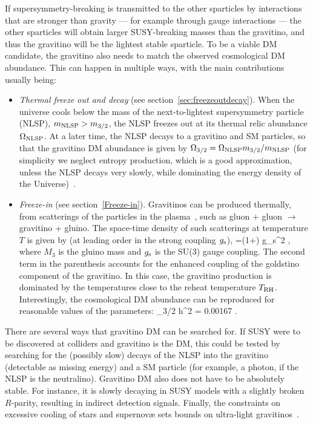 If supersymmetry-breaking is transmitted to the other sparticles by interactions that are stronger than gravity --- for example through gauge interactions ---
the other sparticles will obtain larger SUSY-breaking masses than the gravitino, and thus 
the gravitino will be the lightest stable sparticle.
To be a viable DM candidate, the gravitino also needs to match the observed cosmological DM abundance. 
This can happen in multiple ways, with the main contributions usually being:
\begin{itemize}
\item[$\circ$] {\em Thermal freeze out and decay} (see section~\ref{sec:freezeoutdecay}). 
When the universe cools below the mass of the next-to-lightest supersymmetry particle (NLSP),
$m_{\rm NLSP} > m_{3/2}$,
the NLSP freezes out at its thermal relic abundance $\Omega_{\rm NLSP}$.
At a later time, the NLSP decays to a gravitino and SM particles, so that the gravitino DM abundance is given by
$  \Omega_{3/2} = \Omega_{\rm NLSP}m_{3/2}/m_{\rm NLSP}$
(for simplicity we neglect entropy production, which is a good approximation, unless the NLSP decays very slowly, while dominating the energy density of the Universe)~\cite{gravitinoCosmo2}.

\item[$\circ$]
{\em Freeze-in} (see section~\ref{Freeze-in}). Gravitinos can be produced thermally, from scatterings of the particles in the plasma~\cite{gravitinoCosmo},
such as gluon + gluon $\to$ gravitino + gluino.
The space-time density of such scatterings at temperature $T$ is given by (at leading order in the strong coupling $g_{\rm s}$),
\beq\label{eq:Buch}
 \gamma =\left(1+\right)
   g_{\rm s}^2 \ln {},
  \eeq
where $M_3$ is the gluino mass and $g_{\rm s}$ is the SU(3) gauge coupling. 
The   second term in the parenthesis accounts for the enhanced coupling of the goldstino component of the gravitino.
In this case, the gravitino production is dominated  by the temperatures close to the reheat temperature $T_{\rm RH}$. Interestingly,
the cosmological DM abundance can be reproduced for reasonable values of the parameters:
 \beq \Omega_{3/2} h^2 =
 0.00167  . \eeq 
\end{itemize}
There are several ways that gravitino DM can be searched for. If SUSY were to be discovered at colliders and gravitino is the DM,
this could be tested by searching for the (possibly slow) decays of the NLSP 
into the gravitino (detectable as missing energy) and a SM particle
(for example, a photon, if the NLSP is the neutralino).
Gravitino DM also does not have to be absolutely stable. For instance, it is slowly decaying in SUSY models with a slightly broken $R$-parity,
resulting in indirect detection signals.
Finally, the constraints on excessive cooling of stars and supernov\ae{} sets bounds on ultra-light gravitinos~\cite{GravitinoPheno}.


